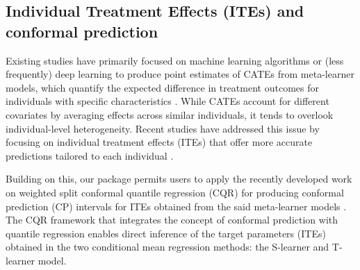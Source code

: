 \begin{table}[!h]
    \centering
    \label{tab:pseudoS}
\end{table}

\subsection{Individual Treatment Effects (ITEs) and conformal prediction}\label{individual-treatment-effects-ites-and-conformal-prediction}

Existing studies have primarily focused on machine learning algorithms
or (less frequently) deep learning to produce point estimates of CATEs
from meta-learner models, which quantify the expected difference in
treatment outcomes for individuals with specific characteristics
\citep{Wager2019estimation, Kunzel2019meta}. While CATEs account for
different covariates by averaging effects across similar individuals, it
tends to overlook individual-level heterogeneity. Recent studies have
addressed this issue by focusing on individual treatment effects (ITEs)
that offer more accurate predictions tailored to each individual
\citep{alaa2018limits}.

Building on this, our package permits users to apply the recently
developed work on weighted split conformal quantile regression (CQR) for
producing conformal prediction (CP) intervals for ITEs obtained from the
said meta-learner models \citep{Lei2021conformal, Alaa2023conformal}. The
CQR framework that integrates the concept of conformal prediction with
quantile regression enables direct inference of the target parameters
(ITEs) obtained in the two conditional mean regression methods: the
S-learner and T-learner model.

